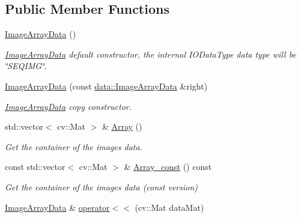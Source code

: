 \subsection*{Public Member Functions}
\begin{DoxyCompactItemize}
\item 
\mbox{\label{classfilter_1_1data_1_1_image_array_data_a410e2084318c82c3ed886a467757b027}} 
\hyperlink{classfilter_1_1data_1_1_image_array_data_a410e2084318c82c3ed886a467757b027}{Image\+Array\+Data} ()
\begin{DoxyCompactList}\small\item\em \hyperlink{classfilter_1_1data_1_1_image_array_data}{Image\+Array\+Data} default constructor, the internal I\+O\+Data\+Type data type will be \char`\"{}\+S\+E\+Q\+I\+M\+G\char`\"{}. \end{DoxyCompactList}\item 
\hyperlink{classfilter_1_1data_1_1_image_array_data_aaaf37db86b4659ac8cb10e5f44a2869b}{Image\+Array\+Data} (const \hyperlink{classfilter_1_1data_1_1_image_array_data}{data\+::\+Image\+Array\+Data} \&right)
\begin{DoxyCompactList}\small\item\em \hyperlink{classfilter_1_1data_1_1_image_array_data}{Image\+Array\+Data} copy constructor. \end{DoxyCompactList}\item 
std\+::vector$<$ cv\+::\+Mat $>$ \& \hyperlink{classfilter_1_1data_1_1_image_array_data_acded510f22f9c549adea6174e44dae2a}{Array} ()
\begin{DoxyCompactList}\small\item\em Get the container of the images\textquotesingle{} data. \end{DoxyCompactList}\item 
const std\+::vector$<$ cv\+::\+Mat $>$ \& \hyperlink{classfilter_1_1data_1_1_image_array_data_a5bc06808faaf76e0cbbb5944788cef79}{Array\+\_\+const} () const
\begin{DoxyCompactList}\small\item\em Get the container of the images\textquotesingle{} data (const version) \end{DoxyCompactList}\item 
\hyperlink{classfilter_1_1data_1_1_image_array_data}{Image\+Array\+Data} \& \hyperlink{classfilter_1_1data_1_1_image_array_data_a43e4ed2752d0ae2a1685d1f52adcebde}{operator$<$$<$} (cv\+::\+Mat data\+Mat)

\end{DoxyCompactItemize}
